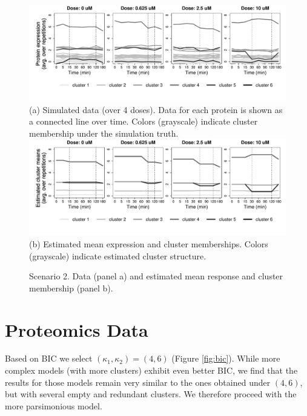 \begin{figure}[tbp]
\begin{center}
\includegraphics[width=.95\textwidth]{figs_biometrics/scenario2_y_gray_21}\\
(a) Simulated data (over 4 doses). Data for each protein is shown as a
connected line over time. Colors (grayscale) indicate cluster membership
under the simulation truth.\\[4pt]
\includegraphics[width=.95\textwidth]{figs_biometrics/scenario2_means_gray_21}\\
(b) Estimated mean expression and cluster memberships. Colors (grayscale) indicate estimated cluster structure.
\end{center}
\caption{Scenario 2. Data (panel a) and estimated mean response and
  cluster membership (panel b).}
\label{fig:sc2}
\end{figure}


\section{Proteomics Data}
\label{sec:results}

Based on BIC we select  $(\kappa_1,\kappa_2)=(4,6)$ (Figure \ref{fig:bic}). While more complex models (with more clusters) exhibit
even better BIC, we find that the results for those models remain very
similar to the ones obtained under $(4,6)$, but with several empty and
redundant clusters. We therefore proceed with the more parsimonious model.

